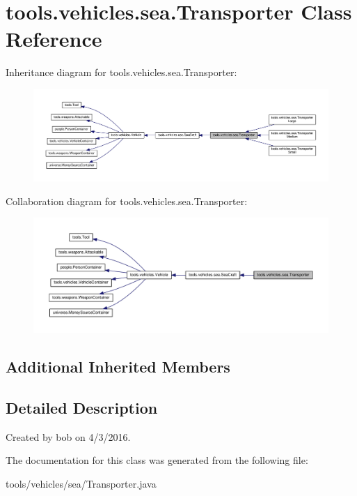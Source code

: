 \hypertarget{classtools_1_1vehicles_1_1sea_1_1_transporter}{}\section{tools.\+vehicles.\+sea.\+Transporter Class Reference}
\label{classtools_1_1vehicles_1_1sea_1_1_transporter}


Inheritance diagram for tools.\+vehicles.\+sea.\+Transporter\+:\nopagebreak
\begin{figure}[H]
\begin{center}
\leavevmode
\includegraphics[width=350pt]{classtools_1_1vehicles_1_1sea_1_1_transporter__inherit__graph}
\end{center}
\end{figure}


Collaboration diagram for tools.\+vehicles.\+sea.\+Transporter\+:\nopagebreak
\begin{figure}[H]
\begin{center}
\leavevmode
\includegraphics[width=350pt]{classtools_1_1vehicles_1_1sea_1_1_transporter__coll__graph}
\end{center}
\end{figure}
\subsection*{Additional Inherited Members}


\subsection{Detailed Description}
Created by bob on 4/3/2016. 

The documentation for this class was generated from the following file\+:\begin{DoxyCompactItemize}
\item 
tools/vehicles/sea/Transporter.\+java\end{DoxyCompactItemize}
